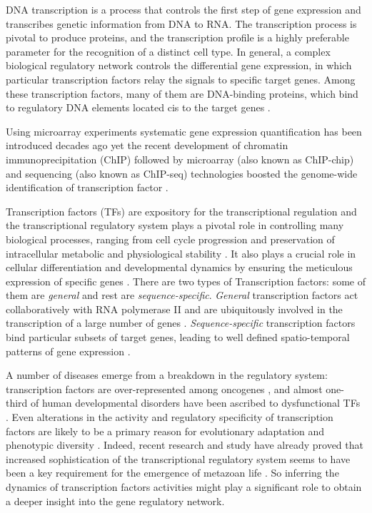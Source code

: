 DNA transcription is a process that controls the first step of gene expression and transcribes genetic information from DNA to RNA. The transcription process is pivotal to produce proteins, and the transcription profile is a highly preferable parameter for the recognition of a distinct cell type. In general, a complex biological regulatory network controls the differential gene expression, in which particular transcription factors relay the signals to specific target genes. Among these transcription factors, many of them are DNA-binding proteins, which bind to regulatory DNA elements located cis to the target genes \cite{Calkhoven:1996}.

Using microarray experiments systematic gene expression quantification has been introduced decades ago \cite{Schena:1995} yet the recent development of chromatin immunoprecipitation (ChIP) followed by microarray (also known as ChIP-chip) and sequencing (also known as ChIP-seq) technologies boosted the genome-wide identification of transcription factor \cite{Ren:2000, Horak:2002}.

Transcription factors (TFs) are expository for the transcriptional regulation and the transcriptional regulatory system plays a pivotal role in controlling many biological processes, ranging from cell cycle progression and preservation of intracellular metabolic and physiological stability \cite{Simon:2001, Takahashi:2006}. It also plays a crucial role in cellular differentiation and developmental dynamics by ensuring the meticulous expression of specific genes \cite{Dynlacht:1997}. There are two types of Transcription factors: some of them are \emph{general} and rest are \emph{sequence-specific}. \emph{General} transcription factors act collaboratively with RNA polymerase II and are ubiquitously involved in the transcription of a large number of genes \cite{Lee:2000}. \emph{Sequence-specific} transcription factors bind particular subsets of target genes, leading to well defined spatio-temporal patterns of gene expression \cite{Kadonaga:2004}.

A number of diseases emerge from a breakdown in the regulatory system: transcription factors are over-represented among oncogenes \cite{Furney:2006}, and almost one-third of human developmental disorders have been ascribed to dysfunctional TFs \cite{Boyadjiev:2000}. Even alterations in the activity and regulatory specificity of transcription factors are likely to be a primary reason for evolutionary adaptation and phenotypic diversity \cite{Subhajyoti:2008}. Indeed, recent research and study have already proved that increased sophistication of the transcriptional regulatory system seems to have been a key requirement for the emergence of metazoan life \cite{Levine:2003}. So inferring the dynamics of transcription factors activities might play a significant role to obtain a deeper insight into the gene regulatory network.

